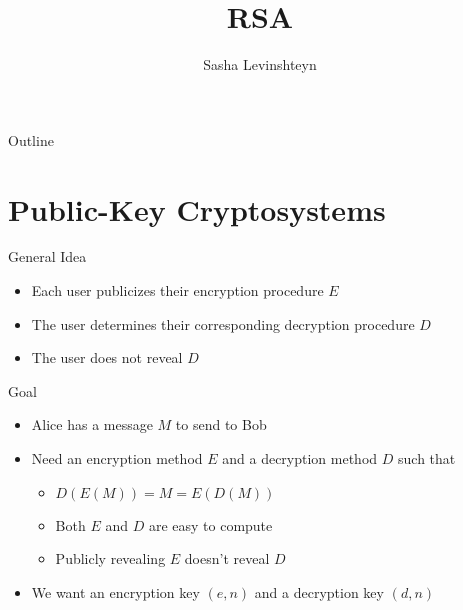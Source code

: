 \documentclass[handout, aspectratio=169]{beamer}
\title{RSA}
\author{Sasha Levinshteyn}
\date{}
\begin{document}

\begin{frame}
\titlepage
\end{frame}

\begin{frame}{Outline}
  \tableofcontents
\end{frame}


\section{Public-Key Cryptosystems}
\frame{\sectionpage}

\begin{frame}{General Idea}
    \begin{itemize}
        \item Each user publicizes their encryption procedure $E$
        \item The user determines their corresponding decryption procedure $D$
        \item The user does not reveal $D$
    \end{itemize}
\end{frame}

\begin{frame}{Goal}
    \begin{itemize}
        \item Alice has a message $M$ to send to Bob
        \item Need an encryption method $E$ and a decryption method $D$ such that
        \begin{itemize}
            \item $D(E(M)) = M = E(D(M))$
            \item Both $E$ and $D$ are easy to compute
            \item Publicly revealing $E$ doesn't reveal $D$
        \end{itemize}
        \item We want an encryption key $(e, n)$ and a decryption key $(d, n)$
    \end{itemize}
\end{frame}
\end{document}
